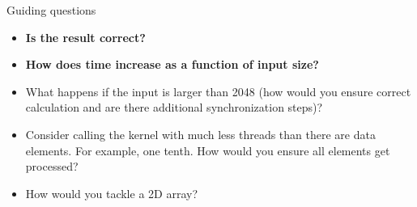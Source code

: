 \documentclass[11pt,t]{beamer}
\begin{document}
\begin{frame}{Guiding questions} 

    \begin{itemize}\setlength\itemsep{1em}
        \item \textbf{Is the result correct?}
        \item \textbf{How does time increase as a function of input size?}
        \item What happens if the input is larger than 2048 (how would you ensure correct calculation and are there additional synchronization steps)?
        \item Consider calling the kernel with much less threads than there are data elements. For example, one tenth. How would you ensure all elements get processed?
        \item How would you tackle a 2D array?
    \end{itemize}

\end{frame}
\end{document}
